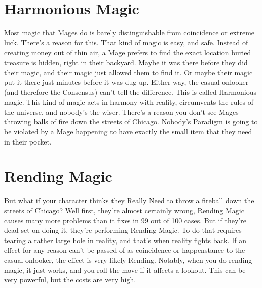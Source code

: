 \documentclass[
  oneside,
  statementpaper,
  9pt]{memoir}
\begin{document}
\hypertarget{harmonious-magic}{%
\section{Harmonious Magic}\label{harmonious-magic}}

\begin{Player}

Most magic that Mages do is barely distinguishable from coincidence or extreme luck. There’s a reason for this. That kind of magic is easy, and safe. Instead of creating money out of thin air, a Mage prefers to find the exact location buried treasure is hidden, right in their backyard. Maybe it was there before they did their magic, and their magic just allowed them to find it. Or maybe their magic put it there just minutes before it was dug up. Either way, the casual onlooker (and therefore the Consensus) can’t tell the difference. This is called Harmonious magic. This kind of magic acts in harmony with reality, circumvents the rules of the universe, and nobody’s the wiser. There’s a reason you don’t see Mages throwing balls of fire down the streets of Chicago. Nobody’s Paradigm is going to be violated by a Mage happening to have exactly the small item that they need in their pocket.

\end{Player}

\hypertarget{rending-magic}{%
\section{Rending Magic}\label{rending-magic}}

\begin{Player}

But what if your character thinks they Really Need to throw a fireball down the streets of Chicago? Well first, they’re almost certainly wrong, Rending Magic causes many more problems than it fixes in 99 out of 100 cases. But if they’re dead set on doing it, they’re performing Rending Magic. To do that requires tearing a rather large hole in reality, and that’s when reality fights back. If an effect for any reason can’t be passed of as coincidence or happenstance to the casual onlooker, the effect is very likely Rending. Notably, when you do rending magic, it just works, and you roll the move if it affects a lookout. This can be very powerful, but the costs are very high.

\end{Player}
\end{document}
